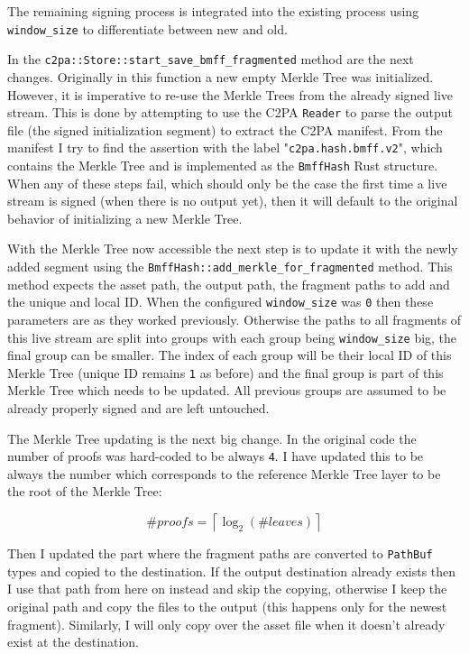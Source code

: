 The remaining signing process is integrated into the existing process using \texttt{window\_size} to differentiate between new and old.

In the \texttt{c2pa::Store::start\_save\_bmff\_fragmented} method are the next changes. Originally in this function a new empty Merkle Tree was initialized. However, it is imperative to re-use the Merkle Trees from the already signed live stream. This is done by attempting to use the C2PA \texttt{Reader} to parse the output file (the signed initialization segment) to extract the C2PA manifest. From the manifest I try to find the assertion with the label "\texttt{c2pa.hash.bmff.v2}", which contains the Merkle Tree and is implemented as the \texttt{BmffHash} Rust structure. When any of these steps fail, which should only be the case the first time a live stream is signed (when there is no output yet), then it will default to the original behavior of initializing a new Merkle Tree.

With the Merkle Tree now accessible the next step is to update it with the newly added segment using the \texttt{BmffHash::add\_merkle\_for\_fragmented} method. This method expects the asset path, the output path, the fragment paths to add and the unique and local ID. When the configured \texttt{window\_size} was \texttt{0} then these parameters are as they worked previously. Otherwise the paths to all fragments of this live stream are split into groups with each group being \texttt{window\_size} big, the final group can be smaller. The index of each group will be their local ID of this Merkle Tree (unique ID remains \texttt{1} as before) and the final group is part of this Merkle Tree which needs to be updated. All previous groups are assumed to be already properly signed and are left untouched.

The Merkle Tree updating is the next big change. In the original code the number of proofs was hard-coded to be always \texttt{4}. I have updated this to be always the number which corresponds to the reference Merkle Tree layer to be the root of the Merkle Tree:

\begin{equation}
    \#proofs = \left\lceil \log_2({\#leaves}) \right\rceil
    \label{eq:proofs}
\end{equation}

Then I updated the part where the fragment paths are converted to \texttt{PathBuf} types and copied to the destination. If the output destination already exists then I use that path from here on instead and skip the copying, otherwise I keep the original path and copy the files to the output (this happens only for the newest fragment). Similarly, I will only copy over the asset file when it doesn't already exist at the destination.

